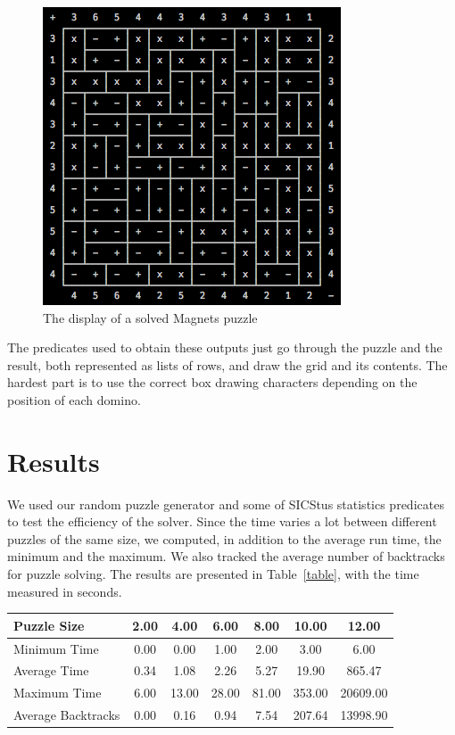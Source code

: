 \documentclass{llncs}
\begin{document}
\begin{figure}[htbp]
\begin{center}
\includegraphics[scale=0.6]{result.png}
\caption{The display of a solved Magnets puzzle}
\label{result}
\end{center}
\end{figure}

The predicates used to obtain these outputs just go through the puzzle and the result, both represented as lists of rows, and draw the grid and its contents. The hardest part is to use the correct box drawing characters depending on the position of each domino.

\section{Results}

We used our random puzzle generator and some of SICStus statistics predicates to test the efficiency of the solver. Since the time varies a lot between different puzzles of the same size, we computed, in addition to the average run time, the minimum and the maximum. We also tracked the average number of backtracks for puzzle solving. The results are presented in Table~\ref{table}, with the time measured in seconds.

\begin{center}
\begin{tabular}{ | l || c | c | c | c | c | c | }
	\hline
	Puzzle Size 	&	2.00	&	4.00	&	6.00	&	8.00	&	10.00	&	12.00	\\\hline
	Minimum Time	&	0.00	&	0.00	&	1.00	&	2.00	&	3.00	&	6.00	\\\hline
	Average Time	&	0.34	&	1.08	&	2.26	&	5.27	&	19.90	&	865.47	\\\hline
	Maximum Time	&	6.00	&	13.00	&	28.00	&	81.00	&	353.00	&	20609.00	\\\hline
	Average Backtracks	&	0.00	&	0.16	&	0.94	&	7.54	&	207.64	&	13998.90	\\\hline
\end{tabular}
\label{table}
\end{center}
\end{document}
